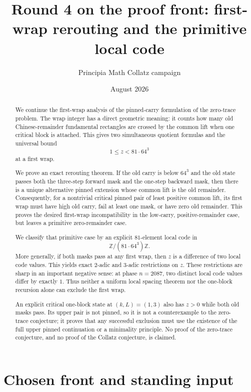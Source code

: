 \documentclass[11pt]{article}
\title{Round 4 on the proof front: first-wrap rerouting and the primitive local code}
\author{Principia Math Collatz campaign}
\date{August 2026}
\theoremstyle{remark}
\newcommand{\Z}{\mathbb{Z}}
\begin{document}
\maketitle

\begin{abstract}
We continue the first-wrap analysis of the pinned-carry formulation of the zero-trace problem.  The wrap integer has a direct geometric meaning: it counts how many old Chinese-remainder fundamental rectangles are crossed by the common lift when one critical block is attached.  This gives two simultaneous quotient formulas and the universal bound
\[
1\le z<81\cdot64^3
\]
at a first wrap.

We prove an exact rerouting theorem.  If the old carry is below \(64^3\) and the old state passes both the three-step forward mask and the one-step backward mask, then there is a unique alternative pinned extension whose common lift is the old remainder.  Consequently, for a nontrivial critical pinned pair of least positive common lift, its first wrap must have high old carry, fail at least one mask, or have zero old remainder.  This proves the desired first-wrap incompatibility in the low-carry, positive-remainder case, but leaves a primitive zero-remainder case.

We classify that primitive case by an explicit \(81\)-element local code in
\[
\Z/(81\cdot64^3)\Z.
\]
More generally, if both masks pass at any first wrap, then \(z\) is a difference of two local code values.  This yields exact \(2\)-adic and \(3\)-adic restrictions on \(z\).  These restrictions are sharp in an important negative sense: at phase \(n=2087\), two distinct local code values differ by exactly \(1\).  Thus neither a uniform local spacing theorem nor the one-block recursion alone can exclude the first wrap.

An explicit critical one-block state at \((k,L)=(1,3)\) also has \(z>0\) while both old masks pass.  Its upper pair is not pinned, so it is not a counterexample to the zero-trace conjecture; it proves that any successful exclusion must use the existence of the full upper pinned continuation or a minimality principle.  No proof of the zero-trace conjecture, and no proof of the Collatz conjecture, is claimed.
\end{abstract}

\section{Chosen front and standing input}
\end{document}
